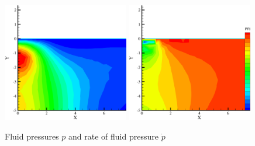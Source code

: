 \begin{figure}[!htb]
\begin{center}
\includegraphics[width=0.49\textwidth]{chapter_14/figures/fig_14_1_8_a}
\includegraphics[width=0.49\textwidth]{chapter_14/figures/fig_14_1_8_b}
\end{center}
\caption{Fluid pressures $p$ and rate of fluid pressure $\dot p$ }
\label{fig_dynHM1}
\end{figure}

